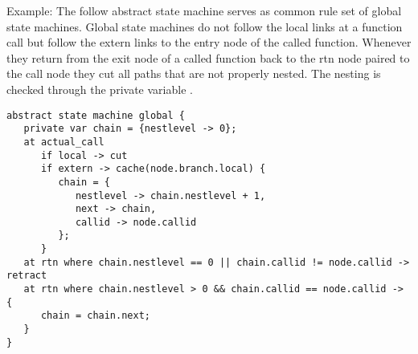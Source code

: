 \noindent
Example: The follow abstract state machine serves as common rule set
of global state machines. Global state machines do not follow
the local links at a function call but follow the extern links to
the entry node of the called function. Whenever they return from
the exit node of a called function back to the rtn node paired
to the call node they cut all paths that are not properly nested.
The nesting is checked through the private variable .

\label{smglobal}
\begin{lstlisting}
abstract state machine global {
   private var chain = {nestlevel -> 0};
   at actual_call
      if local -> cut
      if extern -> cache(node.branch.local) {
         chain = {
            nestlevel -> chain.nestlevel + 1,
            next -> chain,
            callid -> node.callid
         };
      }
   at rtn where chain.nestlevel == 0 || chain.callid != node.callid -> retract
   at rtn where chain.nestlevel > 0 && chain.callid == node.callid -> {
      chain = chain.next;
   }
}
\end{lstlisting}

\endinput
